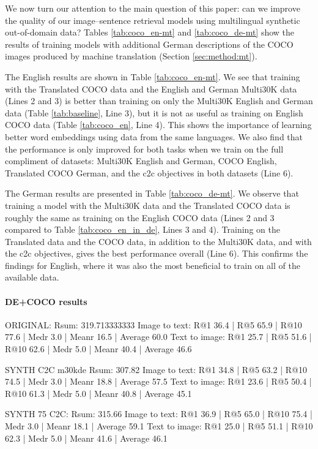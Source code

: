 We now turn our attention to the main question of this paper: can we improve the quality of our image--sentence retrieval models using multilingual synthetic out-of-domain data? Tables \ref{tab:coco_en-mt} and \ref{tab:coco_de-mt} show the results of training models with additional German descriptions of the COCO images produced by machine translation (Section \ref{sec:method:mt}).

The English results are shown in Table \ref{tab:coco_en-mt}. We see that training with the Translated COCO data and the English and German Multi30K data (Lines 2 and 3) is better than training on only the Multi30K English and German data (Table \ref{tab:baseline}, Line 3), but it is not as useful as training on English COCO data (Table \ref{tab:coco_en}, Line 4). This shows the importance of learning better word embeddings using data from the same languages. We also find that the performance is only improved for both tasks when we train on the full compliment of datasets: Multi30K English and German, COCO English, Translated COCO German, and the c2c objectives in both datasets (Line 6).

The German results are presented in Table \ref{tab:coco_de-mt}. We observe that training a model with the Multi30K data and the Translated COCO data is roughly the same as training on the English COCO data (Lines 2 and 3 compared to Table \ref{tab:coco_en_in_de}, Lines 3 and 4). Training on the Translated data and the COCO data, in addition to the Multi30K data, and with the c2c objectives, gives the best performance overall (Line 6). This confirms the findings for English, where it was also the most beneficial to train on all of the available data.

\paragraph{DE+COCO results}


ORIGINAL:
Rsum: 319.713333333
Image to text: R@1 36.4 | R@5 65.9 | R@10 77.6 | Medr 3.0 | Meanr 16.5 | Average 60.0
Text to image: R@1 25.7 | R@5 51.6 | R@10 62.6 | Medr 5.0 | Meanr 40.4 | Average 46.6

SYNTH C2C
m30kde
Rsum: 307.82
Image to text: R@1 34.8 | R@5 63.2 | R@10 74.5 | Medr 3.0 | Meanr 18.8 | Average 57.5
Text to image: R@1 23.6 | R@5 50.4 | R@10 61.3 | Medr 5.0 | Meanr 40.8 | Average 45.1

SYNTH 75 C2C:
Rsum: 315.66
Image to text: R@1 36.9 | R@5 65.0 | R@10 75.4 | Medr 3.0 | Meanr 18.1 | Average 59.1
Text to image: R@1 25.0 | R@5 51.1 | R@10 62.3 | Medr 5.0 | Meanr 41.6 | Average 46.1


